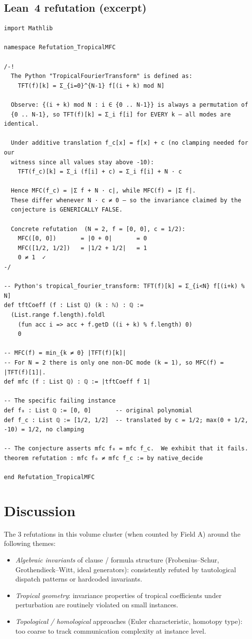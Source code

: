 \documentclass[11pt,a4paper]{article}
\begin{document}
\subsection*{Lean~4 refutation (excerpt)}
\begin{lstlisting}
import Mathlib

namespace Refutation_TropicalMFC

/-!
  The Python "TropicalFourierTransform" is defined as:
    TFT(f)[k] = Σ_{i=0}^{N-1} f[(i + k) mod N]

  Observe: {(i + k) mod N : i ∈ {0 .. N-1}} is always a permutation of
  {0 .. N-1}, so TFT(f)[k] = Σ_i f[i] for EVERY k — all modes are identical.

  Under additive translation f_c[x] = f[x] + c (no clamping needed for our
  witness since all values stay above -10):
    TFT(f_c)[k] = Σ_i (f[i] + c) = Σ_i f[i] + N · c

  Hence MFC(f_c) = |Σ f + N · c|, while MFC(f) = |Σ f|.
  These differ whenever N · c ≠ 0 — so the invariance claimed by the
  conjecture is GENERICALLY FALSE.

  Concrete refutation  (N = 2, f = [0, 0], c = 1/2):
    MFC([0, 0])       = |0 + 0|       = 0
    MFC([1/2, 1/2])   = |1/2 + 1/2|   = 1
    0 ≠ 1  ✓
-/

-- Python's tropical_fourier_transform: TFT(f)[k] = Σ_{i<N} f[(i+k) % N]
def tftCoeff (f : List ℚ) (k : ℕ) : ℚ :=
  (List.range f.length).foldl
    (fun acc i => acc + f.getD ((i + k) % f.length) 0)
    0

-- MFC(f) = min_{k ≠ 0} |TFT(f)[k]|
-- For N = 2 there is only one non-DC mode (k = 1), so MFC(f) = |TFT(f)[1]|.
def mfc (f : List ℚ) : ℚ := |tftCoeff f 1|

-- The specific failing instance
def f₀ : List ℚ := [0, 0]       -- original polynomial
def f_c : List ℚ := [1/2, 1/2]  -- translated by c = 1/2; max(0 + 1/2, -10) = 1/2, no clamping

-- The conjecture asserts mfc f₀ = mfc f_c.  We exhibit that it fails.
theorem refutation : mfc f₀ ≠ mfc f_c := by native_decide

end Refutation_TropicalMFC
\end{lstlisting}


\section{Discussion}
The 3 refutations in this volume cluster (when counted by Field A)
around the following themes:
\begin{itemize}
  \item \emph{Algebraic invariants} of clause / formula structure
    (Frobenius--Schur, Grothendieck--Witt, ideal generators):
    consistently refuted by tautological dispatch patterns or hardcoded
    invariants.
  \item \emph{Tropical geometry}: invariance properties of tropical
    coefficients under perturbation are routinely violated on small
    instances.
  \item \emph{Topological / homological} approaches (Euler
    characteristic, homotopy type): too coarse to track communication
    complexity at instance level.
\end{itemize}
\end{document}
